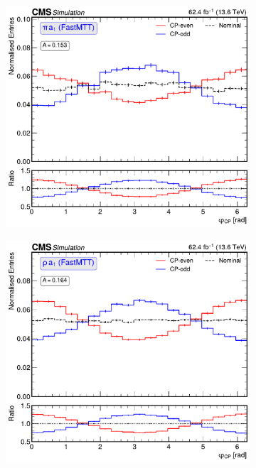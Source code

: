 \begin{figure}[!htbp]
        \centering
        \begin{subfigure}[b]{0.49\textwidth}
            \centering
            \includegraphics[width=\textwidth]{Figures/Chapter7/Acoplanarity/With_IP/aco_pi_a1_FASTMTT_MassConstraint.pdf}
            \caption{}
        \end{subfigure}
        \begin{subfigure}[b]{0.49\textwidth}
            \centering
            \includegraphics[width=\textwidth]{Figures/Chapter7/Acoplanarity/With_IP/aco_rho_a1_FASTMTT_MassConstraint.pdf}

\end{subfigure}
\end{figure}
